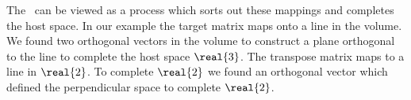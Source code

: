 The \svdl \ can be viewed as a process which sorts out these mappings and completes the host space. In our example the target matrix maps onto a line in the volume. We found two orthogonal vectors in the volume to construct a plane orthogonal to the line to complete the host space $\real{3}$. The transpose matrix maps to a line in $\real{2}$. To complete $\real{2}$ we found an orthogonal vector which defined the perpendicular space to complete $\real{2}$. 

\endinput